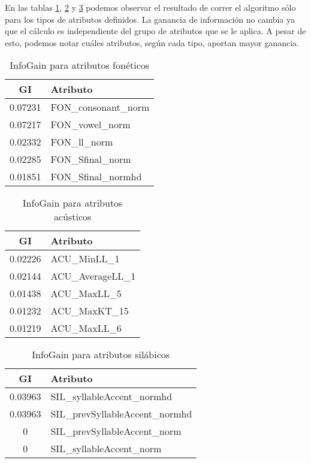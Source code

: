 En las tablas \ref{IG_fon}, \ref{IG_acu} y \ref{IG_sil} podemos observar el resultado de correr el algoritmo sólo para los tipos de atributos definidos. La ganancia de información no cambia ya que el cálculo es independiente del grupo de atributos que se le aplica. A pesar de esto, podemos notar cuáles atributos, según cada tipo, aportan mayor ganancia. 

\begin{minipage}{.5\linewidth}
  	\begin{table}[H]
  	\centering
  	\begin{tabular}{cl}
  		\hline
  		\textbf{GI} & \textbf{Atributo} \\ \hline
		 0.07231 & FON\_consonant\_norm \\
		 0.07217 & FON\_vowel\_norm \\
		 0.02332 & FON\_ll\_norm \\
		 0.02285 & FON\_Sfinal\_norm \\
		 0.01851 & FON\_Sfinal\_normhd \\
  		\hline
  	\end{tabular}
  	\caption{InfoGain para atributos fonéticos}
  	\label{IG_fon}
	\end{table}
\end{minipage}
\begin{minipage}{.5\linewidth}	
  	\begin{table}[H]
  		\centering
  		\begin{tabular}{cl}
  			\hline
  			\textbf{GI} & \textbf{Atributo} \\ \hline
			0.02226 & ACU\_MinLL\_1 \\
			0.02144 & ACU\_AverageLL\_1 \\
			0.01438 & ACU\_MaxLL\_5 \\
			0.01232 & ACU\_MaxKT\_15 \\
			0.01219 & ACU\_MaxLL\_6 \\
  			\hline
  		\end{tabular}
  		\caption{InfoGain para atributos acústicos}
  		\label{IG_acu}
  	\end{table}
\end{minipage}
  	
  	\begin{table}[H]
  		\centering
  		\begin{tabular}{cl}
  			\hline
  			\textbf{GI} & \textbf{Atributo} \\ \hline
  			0.03963 & SIL\_syllableAccent\_normhd \\
  			0.03963 & SIL\_prevSyllableAccent\_normhd \\
  			0       & SIL\_prevSyllableAccent\_norm \\
  			0       & SIL\_syllableAccent\_norm \\
  			\hline
  		\end{tabular}
  		\caption{InfoGain para atributos silábicos} 
  		\label{IG_sil}
  	\end{table}
  	

